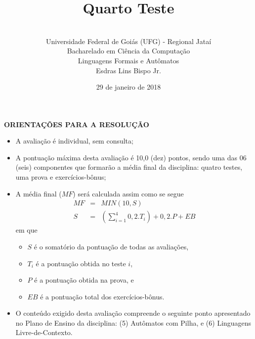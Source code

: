 \documentclass[12pt,a4paper,oneside]{article}
\author{\\Universidade Federal de Goiás (UFG) - Regional  Jataí\\Bacharelado em Ciência da Computação \\Linguagens Formais e Autômatos \\Esdras Lins Bispo Jr.}
\date{29 de janeiro de 2018}
\title{\sc \huge Quarto Teste}
\begin{document}
\maketitle

{\bf ORIENTAÇÕES PARA A RESOLUÇÃO}

\small
 
\begin{itemize}
	\item A avaliação é individual, sem consulta;
	\item A pontuação máxima desta avaliação é 10,0 (dez) pontos, sendo uma das 06 (seis) componentes que formarão a média final da disciplina: quatro testes, uma prova e exercícios-bônus;
	\item A média final ($MF$) será calculada assim como se segue
	\begin{eqnarray}
		MF & = & MIN(10, S) \nonumber \\
		S & = & (\sum_{i=1}^{4} 0,2.T_i ) + 0,2.P  + EB\nonumber
	\end{eqnarray}
	em que 
	\begin{itemize}
		\item $S$ é o somatório da pontuação de todas as avaliações,
		\item $T_i$ é a pontuação obtida no teste $i$,
		\item $P$ é a pontuação obtida na prova, e
		\item $EB$ é a pontuação total dos exercícios-bônus.
	\end{itemize}
	\item O conteúdo exigido desta avaliação compreende o seguinte ponto apresentado no Plano de Ensino da disciplina: (5) Autômatos com Pilha, e (6) Linguagens Livre-de-Contexto.
\end{itemize}

\begin{center}
\end{center}

\newpage
\end{document}
